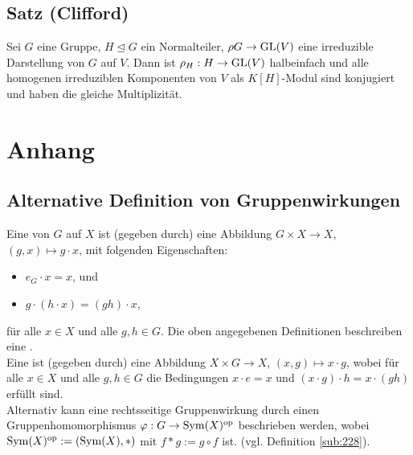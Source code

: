 \subsection{Satz (Clifford)} %
\label{sub:47}
Sei $G$ eine Gruppe, $H \unlhd G$ ein Normalteiler, $\rho G \to \operatorname{GL}(V)$ eine irreduzible Darstellung von $G$ auf $V$. Dann ist $\rho_H : H \to \operatorname{GL}(V)$ halbeinfach und alle
homogenen irreduziblen Komponenten von $V$ als $K[H]$-Modul sind konjugiert und haben die gleiche Multiplizität.


\cleardoubleoddemptypage
\appendix
\section{Anhang} %
\label{sec:anhang}
\subsection{Alternative Definition von Gruppenwirkungen} %
\label{sub:anh_1}
Eine  von $G$ auf $X$ ist (gegeben durch) eine Abbildung $G\times X \to X$, $(g,x)\mapsto g\cdot x$, mit folgenden Eigenschaften:
\begin{itemize}
	\item $e_G \cdot x= x$, und
	\item $g\cdot(h\cdot x)=(gh)\cdot x$,
\end{itemize}
für alle $x \in X$ und alle $g,h\in G$.
Die oben angegebenen Definitionen beschreiben eine .\\
Eine  ist (gegeben durch) eine Abbildung $X\times G \to X$, $(x,g)\mapsto x\cdot g$, 
wobei für alle $x\in X$ und alle $g,h\in G$ die Bedingungen $x\cdot e=x$ und $(x\cdot g) \cdot h =x \cdot (gh)$ erfüllt sind.\\
Alternativ kann eine rechtsseitige Gruppenwirkung durch einen Gruppenhomomorphismus $\varphi : G \to \operatorname{Sym}(X)^{\mathrm{op}}$ beschrieben werden, 
wobei $\operatorname{Sym}(X)^{\mathrm{op}}:=(\operatorname{Sym}(X),*)$ mit $f*g:=g\circ f$ ist. (vgl. Definition \ref{sub:228}).
\newpage
{}
\setcounter{page}{1}

\printindex
\listoffigures
\todototoc
{}

